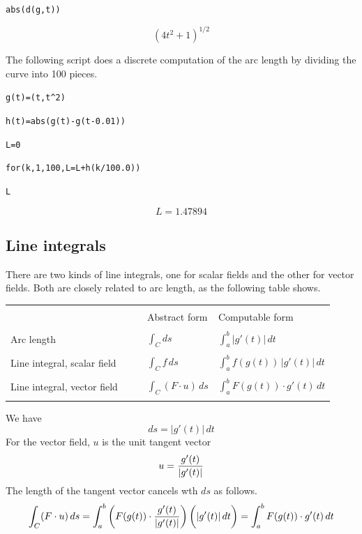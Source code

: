 \medskip
\verb$abs(d(g,t))$

$$(4t^2+1)^{1/2}$$

\medskip
\noindent
The following script does a discrete computation of the arc length by dividing
the curve into 100 pieces.

\medskip
\verb$g(t)=(t,t^2)$

\verb$h(t)=abs(g(t)-g(t-0.01))$

\verb$L=0$

\verb$for(k,1,100,L=L+h(k/100.0))$

\verb$L$

$$L=1.47894$$

\newpage

\subsection{Line integrals}

There are two kinds of line integrals, one for scalar fields and the other
for vector fields.
Both are closely related to arc length, as the following table shows.

\begin{center}

\begin{tabular}{|llll|}
\hline
 & & & \\
& $\quad$
& Abstract form
& Computable form
\\
 & & & \\
Arc length
&
& $\displaystyle{\int_C ds}$
& $\displaystyle{\int_a^b |g'(t)|\,dt}$
\\
 & & & \\
Line integral, scalar field
&
& $\displaystyle{\int_C f\,ds}$
& $\displaystyle{\int_a^b f(g(t))\,|g'(t)|\,dt}$
\\
 & & & \\
Line integral, vector field
&
& $\displaystyle{\int_C(F\cdot u)\,ds}$
& $\displaystyle{\int_a^b F(g(t))\cdot g'(t)\,dt}$
\\
 & & & \\
\hline
\end{tabular}

\end{center}

\medskip
\noindent
We have
$$ds=|g'(t)|\,dt$$
For the vector field, $u$ is the unit tangent vector
$$u={g'(t)\over|g'(t)|}$$
The length of the tangent vector cancels wth $ds$
as follows.
$$\int_C(F\cdot u)\,ds
=\int_a^b\bigg(F(g(t))\cdot{g'(t)\over|g'(t)|}\bigg)\,\bigg(|g'(t)|\,dt\bigg)
=\int_a^b F(g(t))\cdot g'(t)\,dt
$$


